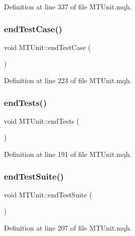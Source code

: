 Definition at line 337 of file M\+T\+Unit.\+mqh.

\mbox{\label{class_m_t_unit_a6717e2370b1bf84b72be622dda8fd624}} 
\subsubsection{\texorpdfstring{end\+Test\+Case()}{endTestCase()}}
{\footnotesize\ttfamily void M\+T\+Unit\+::end\+Test\+Case (\begin{DoxyParamCaption}{ }\end{DoxyParamCaption})}



Definition at line 223 of file M\+T\+Unit.\+mqh.

\mbox{\label{class_m_t_unit_a9d26984442ca8c3a13c3d6aaa581691a}} 
\subsubsection{\texorpdfstring{end\+Tests()}{endTests()}}
{\footnotesize\ttfamily void M\+T\+Unit\+::end\+Tests (\begin{DoxyParamCaption}{ }\end{DoxyParamCaption})}



Definition at line 191 of file M\+T\+Unit.\+mqh.

\mbox{\label{class_m_t_unit_a77ec52865ae9285c4ad1ba532da7b047}} 
\subsubsection{\texorpdfstring{end\+Test\+Suite()}{endTestSuite()}}
{\footnotesize\ttfamily void M\+T\+Unit\+::end\+Test\+Suite (\begin{DoxyParamCaption}{ }\end{DoxyParamCaption})}



Definition at line 207 of file M\+T\+Unit.\+mqh.

